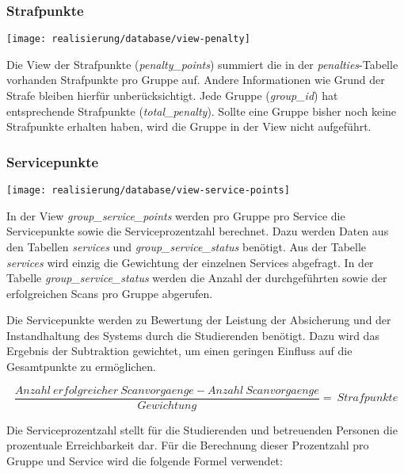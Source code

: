\subsubsection{Strafpunkte}
\begin{center}
	\texttt{[image: realisierung/database/view-penalty]}
	\label{fig:realisierung-view-penalty}
\end{center}

Die View der Strafpunkte (\textit{penalty\_points}) summiert die in der \textit{penalties}-Tabelle vorhanden Strafpunkte pro Gruppe auf. Andere Informationen wie Grund der Strafe bleiben hierfür unberücksichtigt. Jede Gruppe (\textit{group\_id}) hat entsprechende Strafpunkte (\textit{total\_penalty}). Sollte eine Gruppe bisher noch keine Strafpunkte erhalten haben, wird die Gruppe in der View nicht aufgeführt.

\subsubsection{Servicepunkte}
\begin{center}
	\texttt{[image: realisierung/database/view-service-points]}
	\label{fig:realisierung-view-service-points}
\end{center}

In der View \textit{group\_service\_points} werden pro Gruppe pro Service die Servicepunkte sowie die Serviceprozentzahl  berechnet. Dazu werden Daten aus den Tabellen \textit{services} und \textit{group\_service\_status} benötigt. Aus der Tabelle \textit{services} wird einzig die Gewichtung der einzelnen Services abgefragt. In der Tabelle \textit{group\_service\_status} werden die Anzahl der durchgeführten sowie der erfolgreichen Scans pro Gruppe abgerufen.

Die Servicepunkte werden zu Bewertung der Leistung der Absicherung und der Instandhaltung des Systems durch die Studierenden benötigt. Dazu wird das Ergebnis der Subtraktion gewichtet, um einen geringen Einfluss auf die Gesamtpunkte zu ermöglichen.

\begin{equation*}
	\frac{Anzahl~erfolgreicher~Scanvorgaenge - Anzahl~Scanvorgaenge}{Gewichtung}=~Strafpunkte
\end{equation*}


Die Serviceprozentzahl stellt für die Studierenden und betreuenden Personen die prozentuale Erreichbarkeit dar. Für die Berechnung dieser Prozentzahl pro Gruppe und Service wird die folgende Formel verwendet: 

